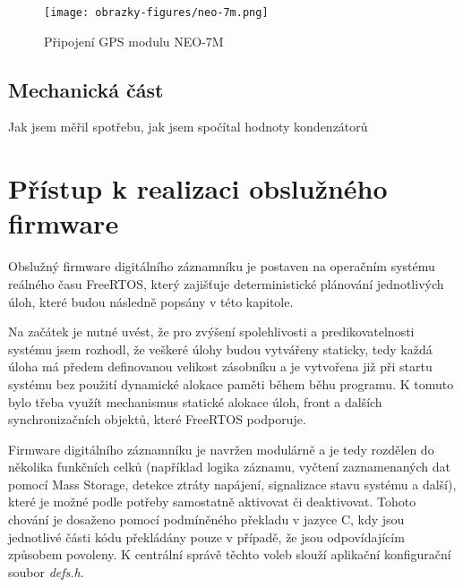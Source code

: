 \begin{figure}[h]
    \centering
    \texttt{[image: obrazky-figures/neo-7m.png]}
    
    \caption{Připojení GPS modulu NEO-7M}
    \label{fig:neo-7m}
\end{figure}

\section{Mechanická část}
Jak jsem měřil spotřebu, jak jsem spočítal hodnoty kondenzátorů 

\chapter{Přístup k realizaci obslužného firmware}
\label{softwarova_implementace}
Obslužný firmware digitálního záznamníku je postaven na operačním systému reálného času FreeRTOS, který zajišťuje deterministické plánování jednotlivých úloh, které budou následně popsány v této kapitole.

Na začátek je nutné uvést, že pro zvýšení spolehlivosti a predikovatelnosti systému jsem rozhodl, že veškeré úlohy budou vytvářeny staticky, tedy každá úloha má předem definovanou velikost zásobníku a je vytvořena již při startu systému bez    použití dynamické alokace paměti během běhu programu. K tomuto bylo třeba využít mechanismus statické alokace úloh, front a dalších synchronizačních objektů, které FreeRTOS podporuje.

Firmware digitálního záznamníku je navržen modulárně a je tedy rozdělen do několika funkčních celků (například logika záznamu, vyčtení zaznamenaných dat pomocí Mass Storage, detekce ztráty napájení, signalizace stavu systému a další), které je možné podle potřeby samostatně aktivovat či deaktivovat. Tohoto chování je dosaženo pomocí podmíněného překladu v jazyce C, kdy jsou jednotlivé části kódu překládány pouze v případě, že jsou odpovídajícím způsobem povoleny. K centrální správě těchto voleb slouží aplikační konfigurační soubor 
\textit{defs.h}.

